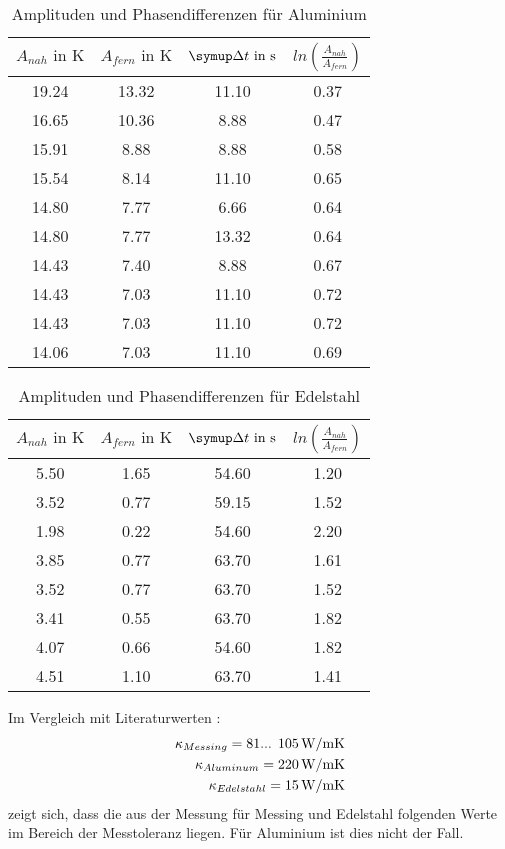 \begin{table}[b]
  \centering
  \caption{Amplituden und Phasendifferenzen für Aluminium}
  \label{tab:Alu}
  \begin{tabular}{c c c c}
    \toprule
    $A_{nah} \text{ in } \si{\kelvin}$ & $A_{fern} \text{ in } \si{\kelvin}$ & $\symup \Delta t \text{ in } \si{\second}$ & $ ln(\frac{A_{nah}}{A_{fern}}) $ \\
    \midrule
    19.24 & 13.32 & 11.10 & 0.37 \\
    16.65 & 10.36 & 8.88 & 0.47 \\
    15.91 & 8.88 & 8.88 & 0.58 \\
    15.54 & 8.14 & 11.10 & 0.65 \\
    14.80 & 7.77 & 6.66 & 0.64 \\
    14.80 & 7.77 & 13.32 & 0.64 \\
    14.43 & 7.40 & 8.88 & 0.67 \\
    14.43 & 7.03 & 11.10 & 0.72 \\
    14.43 & 7.03 & 11.10 & 0.72 \\
    14.06 & 7.03 & 11.10 & 0.69 \\
    \bottomrule
  \end{tabular}
\end{table}

\begin{table}[b]
  \centering
  \caption{Amplituden und Phasendifferenzen für Edelstahl}
  \label{tab:Edelstahl}
  \begin{tabular}{c c c c}
    \toprule
    $A_{nah} \text{ in } \si{\kelvin}$ & $A_{fern} \text{ in } \si{\kelvin}$ & $\symup \Delta t \text{ in } \si{\second}$ & $ln(\frac{A_{nah}}{A_{fern}})$\\
    \midrule
    5.50 & 1.65 & 54.60 & 1.20 \\
    3.52 & 0.77 & 59.15 & 1.52 \\
    1.98 & 0.22 & 54.60 & 2.20 \\
    3.85 & 0.77 & 63.70 & 1.61 \\
    3.52 & 0.77 & 63.70 & 1.52 \\
    3.41 & 0.55 & 63.70 & 1.82 \\
    4.07 & 0.66 & 54.60 & 1.82 \\
    4.51 & 1.10 & 63.70 & 1.41 \\
    \bottomrule
  \end{tabular}
\end{table}

Im Vergleich mit Literaturwerten \cite{literaturwerte}:
\begin{equation*}
  \begin{split}
    \kappa_{Messing} = \num{81}\text{... }\num{105}\,\si{\watt\per{\metre\kelvin}} \\
    \kappa_{Aluminum} = \SI{220}{\watt\per{\metre\kelvin}} \\
    \kappa_{Edelstahl} = \SI{15}{\watt\per{\metre\kelvin}}
  \end{split}
\end{equation*}
zeigt sich, dass die aus der Messung für Messing und Edelstahl folgenden Werte im Bereich der Messtoleranz liegen.
Für Aluminium ist dies nicht der Fall.

